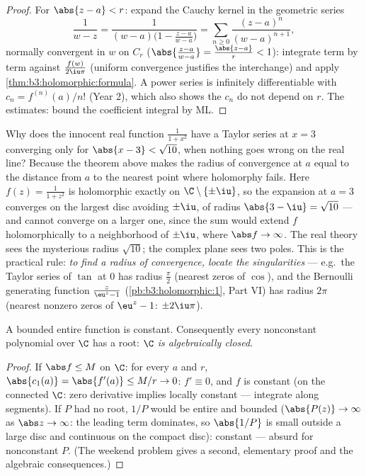 \begin{proof}
For $\abs{z - a} < r$: expand the Cauchy kernel in the
geometric series
\[
\frac1{w - z} = \frac1{(w - a)\bigl(1 - \frac{z - a}{w -
a}\bigr)} = \sum_{n\geq0}\frac{(z - a)^n}{(w - a)^{n+1}},
\]
normally convergent in $w$ on $C_r$ ($\abs{\frac{z-a}{w-a}} =
\frac{\abs{z-a}}r < 1$): integrate term by term against
$\frac{f(w)}{2\iu\pi}$ (uniform convergence justifies the
interchange) and apply \cref{thm:b3:holomorphic:formula}. A
power series is infinitely differentiable with $c_n =
f^{(n)}(a)/n!$ (Year 2), which also shows the $c_n$ do not
depend on $r$. The estimates: bound the coefficient integral
by ML.
\end{proof}

\begin{example}
\label{ex:b3:holomorphic:radius}
Why does the innocent real function $\frac1{1 + x^2}$ have a
Taylor series at $x = 3$ converging only for $\abs{x - 3} <
\sqrt{10}$, when nothing goes wrong on the real line? Because
the theorem above makes the radius of convergence at $a$
equal to the distance from $a$ to the nearest point where
holomorphy fails. Here $f(z) = \frac1{1 + z^2}$ is
holomorphic exactly on $\C\setminus\{\pm\iu\}$, so the
expansion at $a = 3$ converges on the largest disc avoiding
$\pm\iu$, of radius $\abs{3 - \iu} = \sqrt{10}$ --- and
cannot converge on a larger one, since the sum would extend
$f$ holomorphically to a neighborhood of $\pm\iu$, where
$\abs f \to \infty$. The real theory sees the mysterious
radius $\sqrt{10}$; the complex plane sees two poles.
This is the practical rule: \emph{to find a radius of
convergence, locate the singularities} --- e.g.\ the Taylor
series of $\tan$ at $0$ has radius $\frac\pi2$ (nearest
zeros of $\cos$), and the Bernoulli generating function
$\frac z{\eu^z - 1}$ (\cref{pb:b3:holomorphic:1}, Part VI)
has radius $2\pi$ (nearest nonzero zeros of $\eu^z - 1$:
$\pm2\iu\pi$).
\end{example}

\begin{corollary}
\label{cor:b3:holomorphic:liouville}
A bounded entire function is constant. Consequently every
nonconstant polynomial over $\C$ has a root: \emph{$\C$ is
algebraically closed}.
\end{corollary}

\begin{proof}
If $\abs f \leq M$ on $\C$: for every $a$ and $r$, $\abs{c_1(a)}
= \abs{f'(a)} \leq M/r \to 0$: $f' \equiv 0$, and $f$ is
constant (on the connected $\C$: zero derivative implies
locally constant --- integrate along segments). If $P$ had no
root, $1/P$ would be entire and bounded ($\abs{P(z)} \to
\infty$ as $\abs z \to \infty$: the leading term dominates, so
$\abs{1/P}$ is small outside a large disc and continuous on
the compact disc): constant --- absurd for nonconstant $P$.
(The weekend problem gives a second, elementary proof and the
algebraic consequences.)
\end{proof}


